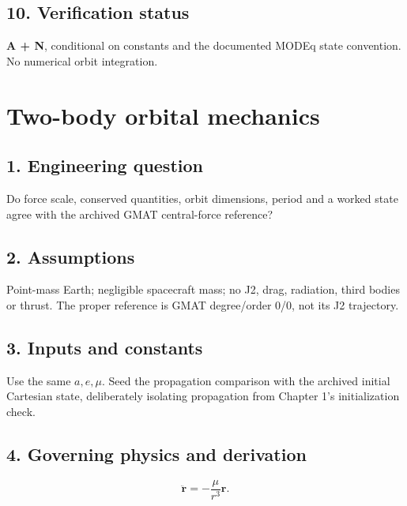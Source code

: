 \documentclass[10pt,a4paper]{article}
\numberwithin{equation}{section}
\begin{document}
\subsection*{10. Verification status}
\begin{sloppypar}\textbf{A + N}, conditional on constants and the documented MODEq state convention. No numerical orbit integration.\end{sloppypar}


\clearpage\section{Two-body orbital mechanics}\label{ch:2}

\subsection*{1. Engineering question}
\begin{sloppypar}Do force scale, conserved quantities, orbit dimensions, period and a worked state agree with the archived GMAT central-force reference?\end{sloppypar}


\subsection*{2. Assumptions}
\begin{sloppypar}Point-mass Earth; negligible spacecraft mass; no J2, drag, radiation, third bodies or thrust. The proper reference is GMAT degree/order 0/0, not its J2 trajectory.\end{sloppypar}


\subsection*{3. Inputs and constants}
\begin{sloppypar}Use the same \(a,e,\mu\). Seed the propagation comparison with the archived initial Cartesian state, deliberately isolating propagation from Chapter 1's initialization check.\end{sloppypar}


\subsection*{4. Governing physics and derivation}

\begin{equation}\ddot{\mathbf r}=-\frac{\mu}{r^3}\mathbf r.\label{eq:ch2-1}\end{equation}
\end{document}

